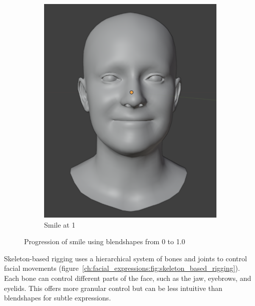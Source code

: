 \documentclass[../../main.tex]{subfiles}
\begin{document}
\begin{figure}[h]
\begin{subfigure}{0.3\linewidth}
      \includegraphics[width=\linewidth]{chapters/background_work/images/blendshapes_example/blendshapes_example_3.png} 
      \caption{Smile at 1} 
  \end{subfigure}
  \caption{Progression of smile using blendshapes from 0 to 1.0}
  \label{fig:blendshapes_smile}
\end{figure}

Skeleton-based rigging uses a hierarchical system of bones and joints to control facial movements (figure~\ref{ch:facial_expressions:fig:skeleton_based_rigging}). Each bone can control different parts of the face, such as the jaw, eyebrows, and eyelids. This offers more granular control but can be less intuitive than blendshapes for subtle expressions.
\end{document}
